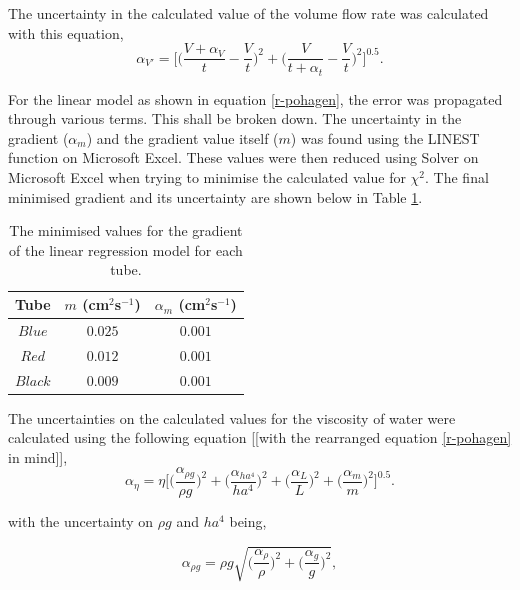 \documentclass[twocolumn]{revtex4}
\begin{document}
The uncertainty in the calculated value of the volume flow rate was calculated with this equation,
\begin{equation} 
\alpha_{V'} = \Bigg[ \Bigg( \frac{V+\alpha_{V}}{t} - \frac{V}{t} \Bigg)^2 + \Bigg( \frac{V}{t+\alpha_{t}} - \frac{V}{t} \Bigg)^2 \Bigg]^{0.5} .
\label{ea-volflow}
\end{equation}

For the linear model as shown in equation \ref{r-pohagen}, the error was propagated through various terms. This shall be broken down. The uncertainty in the gradient ($\alpha_m$) and the gradient value itself ($m$) was found using the LINEST function on Microsoft Excel. These values were then reduced using Solver on Microsoft Excel when trying to minimise the calculated value for $\chi^2$. The final minimised gradient and its uncertainty are shown below in Table \ref{table:2}.

\begin{table}[h!]
\centering
\begin{tabular}{ |c|c|c| } 
 \hline
 \textbf{Tube} & \textbf{$m$ (cm$^{2}$s$^{-1}$)} & \textbf{$\alpha_m$ (cm$^{2}$s$^{-1}$)} \\ [0.5ex] 
 \hline
 $Blue$ &$0.025$ & $0.001$ \\ 
 $Red$ & $0.012$ & $0.001$ \\
 $Black$ & $0.009$ & $0.001$ \\ 
\hline
\end{tabular}
\caption{The minimised values for the gradient of the linear regression model for each tube.}
\label{table:2}
\end{table}

The uncertainties on the calculated values for the viscosity of water were calculated using the following equation [[with the rearranged equation \ref{r-pohagen} in mind]],
\small
\begin{equation} 
\alpha_{\eta} = \eta \Bigg[ \Bigg( \frac{\alpha_{\rho g}}{\rho g} \Bigg)^2 + \Bigg( \frac{\alpha_{ha^4}}{ha^4} \Bigg)^2 + \Bigg( \frac{\alpha_{L}}{L} \Bigg)^2 + \Bigg( \frac{\alpha_{m}}{m} \Bigg)^2 \Bigg]^{0.5}.
\label{ea-viscos}
\end{equation}
\normalsize

with the uncertainty on $\rho g$ and $ha^4$ being,

\begin{equation} 
\alpha_{\rho g} = \rho g \sqrt{ \Bigg( \frac{\alpha_{\rho}}{\rho} \Bigg)^2 + \Bigg( \frac{\alpha_{g}}{g} \Bigg)^2 }, 
\label{ea-rhog}
\end{equation}
\end{document}
